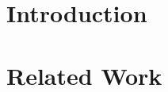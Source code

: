 \documentclass[twocolumn]{article}
\begin{document}
\section{Introduction}

%
\section{Related Work}
\end{document}
